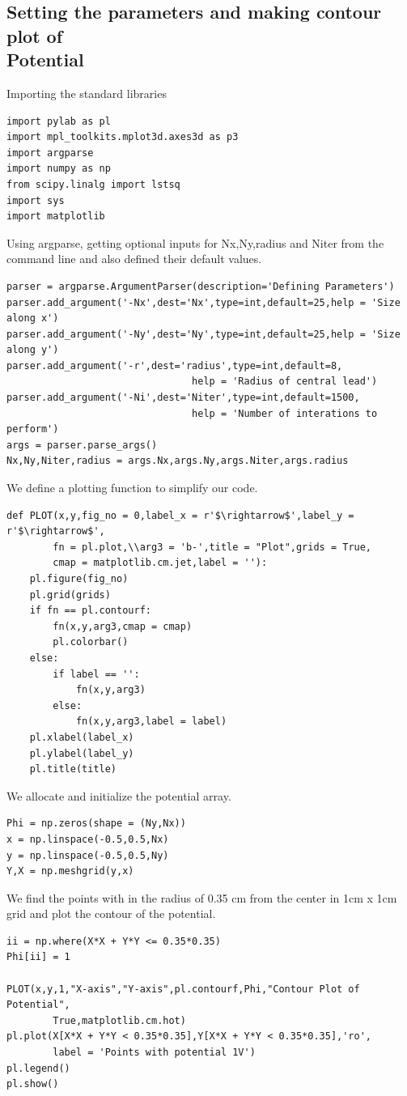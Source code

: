 \documentclass[11pt, a4paper]{article}
\begin{document}
\subsection{Setting the parameters and making contour plot of \\Potential }
Importing the standard libraries
\begin{verbatim}
import pylab as pl
import mpl_toolkits.mplot3d.axes3d as p3
import argparse
import numpy as np
from scipy.linalg import lstsq
import sys
import matplotlib
\end{verbatim}
Using argparse, getting optional inputs for Nx,Ny,radius and Niter from the command line and also defined their default values.
\begin{verbatim}
parser = argparse.ArgumentParser(description='Defining Parameters')
parser.add_argument('-Nx',dest='Nx',type=int,default=25,help = 'Size along x')
parser.add_argument('-Ny',dest='Ny',type=int,default=25,help = 'Size along y')
parser.add_argument('-r',dest='radius',type=int,default=8,
								help = 'Radius of central lead')
parser.add_argument('-Ni',dest='Niter',type=int,default=1500,
								help = 'Number of interations to perform')
args = parser.parse_args()
Nx,Ny,Niter,radius = args.Nx,args.Ny,args.Niter,args.radius
\end{verbatim}
We define a plotting function to simplify our code.
\begin{verbatim}
def PLOT(x,y,fig_no = 0,label_x = r'$\rightarrow$',label_y = r'$\rightarrow$',
		fn = pl.plot,\\arg3 = 'b-',title = "Plot",grids = True,
		cmap = matplotlib.cm.jet,label = ''):
	pl.figure(fig_no)
	pl.grid(grids)
	if fn == pl.contourf:
		fn(x,y,arg3,cmap = cmap)
		pl.colorbar()
	else:
		if label == '':
			fn(x,y,arg3)
		else:
			fn(x,y,arg3,label = label)
	pl.xlabel(label_x)
	pl.ylabel(label_y)
	pl.title(title)
\end{verbatim}
We allocate and initialize the potential array.
\begin{verbatim}
Phi = np.zeros(shape = (Ny,Nx))
x = np.linspace(-0.5,0.5,Nx)
y = np.linspace(-0.5,0.5,Ny)
Y,X = np.meshgrid(y,x)
\end{verbatim}
We find the points with in the radius of 0.35 cm from the center in 1cm x 1cm grid and plot the contour of the potential.
\begin{verbatim}
ii = np.where(X*X + Y*Y <= 0.35*0.35)
Phi[ii] = 1

PLOT(x,y,1,"X-axis","Y-axis",pl.contourf,Phi,"Contour Plot of Potential",
		True,matplotlib.cm.hot)
pl.plot(X[X*X + Y*Y < 0.35*0.35],Y[X*X + Y*Y < 0.35*0.35],'ro',
		label = 'Points with potential 1V')
pl.legend()
pl.show()
\end{verbatim}
\end{document}

